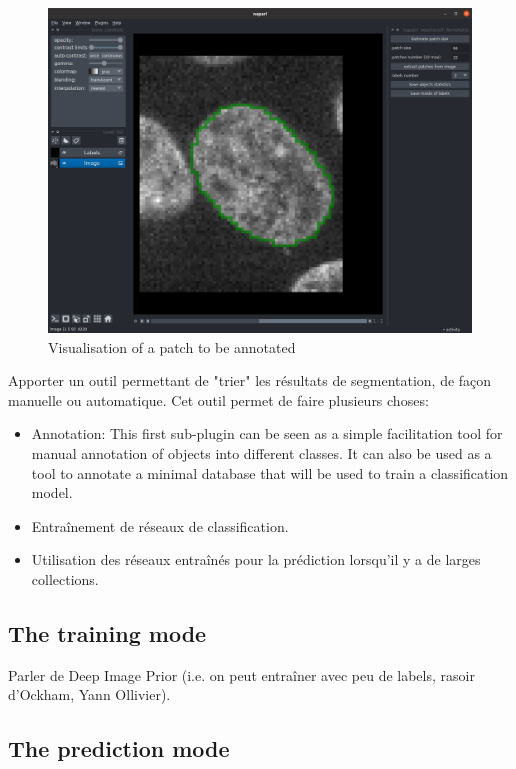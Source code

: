 \documentclass{article}
\begin{document}
\begin{figure}[htp!]
 \centering
 \includegraphics[scale=0.2]{Figures/patch.png}
  \caption{Visualisation of a patch to be annotated}
  \label{patch}

\end{figure}

Apporter un outil permettant de "trier" les résultats de segmentation, de façon manuelle ou automatique. 
Cet outil permet de faire plusieurs choses:
\begin{itemize}
  \item Annotation: This first sub-plugin can be seen as a simple facilitation tool for manual annotation of objects into different classes. It can also be used as a tool to annotate a minimal database that will be used to train a classification model. 
  \item Entraînement de réseaux de classification. 
  \item Utilisation des réseaux entraînés pour la prédiction lorsqu'il y a de larges collections.
\end{itemize}





\subsection{The training mode}

Parler de Deep Image Prior (i.e. on peut entraîner avec peu de labels, rasoir d'Ockham, Yann Ollivier).

\subsection{The prediction mode}
\end{document}
